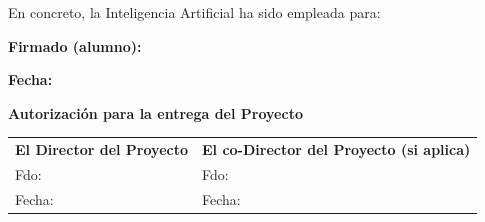 \vspace{0.5cm}

\noindent
En concreto, la Inteligencia Artificial ha sido empleada para:

\vspace{0.3cm}

\noindent
\framebox[\linewidth][l]{\rule{0pt}{4.5cm}}

\vspace{1.2cm}

\noindent
\textbf{Firmado (alumno):}

\vspace{0.8cm}

\noindent
\textbf{Fecha:}

\begin{center}
{\Large\bfseries Autorización para la entrega del Proyecto}
\end{center}

\vspace{1.2cm}

\begin{center}
\begin{tabular}{p{} p{}}

\textbf{El Director del Proyecto} & 
\textbf{El co-Director del Proyecto (si aplica)} \\[2.5cm]

Fdo:\ \hrulefill & Fdo:\ \hrulefill \\[0.8cm]

Fecha:\ \hrulefill & Fecha:\ \hrulefill \\

\end{tabular}
\end{center}